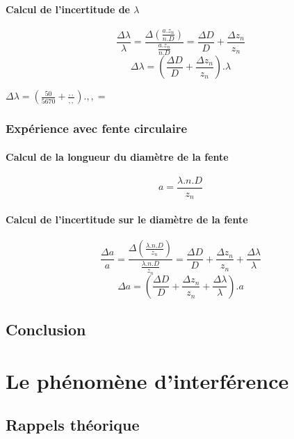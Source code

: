 \documentclass[11pt,a4paper]{report}
\begin{document}
				
		\subsubsection{Calcul de l'incertitude de $\lambda$}
		\begin{equation}
		\frac{\Delta \lambda}{\lambda} = \frac{\Delta\left(\frac{a.z_{n}}{n.D}\right)}{\frac{a.z_{n}}{n.D}} 
		= \frac{\Delta D}{D}+\frac{\Delta z_{n}}{z_{n}}
		\end{equation}
		\begin{equation}
		\Delta \lambda
		= \left(\frac{\Delta D}{D}+\frac{\Delta z_{n}}{z_{n}}\right).\lambda
		\end{equation}
		\begin{center}
		$\Delta \lambda = \left(\frac{50}{5670}+\frac{,,}{,,}\right).,, = $
		\end{center}
		\subsection{Expérience avec fente circulaire}
		\subsubsection{Calcul de la longueur du diamètre de la fente}
		\begin{equation}
		a = \frac{\lambda.n.D}{z_{n}}
		\end{equation}
		\subsubsection{Calcul de l'incertitude sur le diamètre de la fente}
		\begin{equation}
		\frac{\Delta a}{a} =\frac{\Delta\left(\frac{\lambda.n.D}{z_{n}}\right)}{ \frac{\lambda.n.D}{z_{n}}} = \frac{\Delta D}{D}+\frac{\Delta z_{n}}{z_{n}}+ \frac{\Delta \lambda}{\lambda}
		\end{equation}
		\begin{equation}
		\Delta a = \left(\frac{\Delta D}{D}+\frac{\Delta z_{n}}{z_{n}}+\frac{\Delta \lambda}{\lambda}\right).a
		\end{equation}
	\section{Conclusion}
\chapter{Le phénomène d'interférence}
	\section{Rappels théorique}
\end{document}
